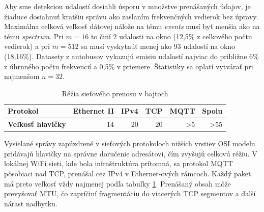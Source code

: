 Aby sme detekciou udalostí dosiahli úsporu v množstve prenášaných údajov, je žiaduce dosiahnuť kratšiu správu ako
zaslaním frekvenčných vedierok bez úpravy. Maximálna celková veľkosť dátovej nálože na tému \emph{events} musí byť menšia
ako na tému \emph{spectrum}. Pri $m = 16$ to činí 2 udalosti na okno (12,5\% z celkového počtu vedierok) a pri $m = 512$
sa musí vyskytnúť menej ako 93 udalostí na okno (18,16\%). Datasety z autobusov vykazujú emisiu udalostí najviac do 
približne 6\% z úhrnného počtu frekvencií a 0,5\% v priemere. Štatistiky sa oplatí vytvárať pri najmenšom $n = 32$.

\begin{table}[h]
\def\arraystretch{1.25}
\centering
\begin{tabular}{|l|r|r|r|r|r|}
\hline
\textbf{Protokol}         & \textbf{Ethernet II} & \textbf{IPv4} & \textbf{TCP} & \textbf{MQTT}  & \textbf{Spolu}  \\ \hline
\textbf{Veľkosť hlavičky} & 14                   & 20            & 20           & \textgreater 5 & \textgreater 55 \\ \hline
\end{tabular}
\caption{Réžia sieťového prenosu v bajtoch}
\label{tab:net-overhead}
\end{table}

Vysielané správy zapúzdrené v sieťových protokoloch nižších vrstiev OSI modelu pridávajú
hlavičky na správne doručenie adresátovi, čím zvyšujú celkovú réžiu. V lokálnej WiFi sieti, kde bola infraštruktúra prítomná,
sa protokol MQTT pôsobiaci nad TCP, prenášal cez IPv4 v Ethernet-ových rámcoch. Každý paket má preto veľkosť vždy najmenej
podľa tabuľky \ref{tab:net-overhead}. Prenášaný obsah môže prevyšovať MTU, čo zapríčiní fragmentáciu do viacerých TCP segmentov
a ďalší nárast nadbytku.

